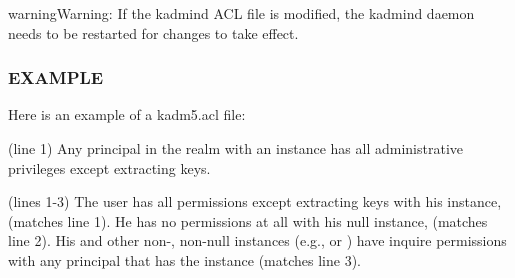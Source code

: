 \documentclass[letterpaper,10pt,english]{sphinxmanual}
\begin{document}
\begin{sphinxadmonition}{warning}{Warning:}
If the kadmind ACL file is modified, the kadmind daemon needs to be
restarted for changes to take effect.
\end{sphinxadmonition}


\subsubsection{EXAMPLE}
\label{\detokenize{admin/conf_files/kadm5_acl:example}}
Here is an example of a kadm5.acl file:

%
\begin{sphinxVerbatim}[commandchars=\\\{\}]
                                   
                             
           
                  
                                   
               
\end{sphinxVerbatim}

(line 1) Any principal in the  realm with an
 instance has all administrative privileges except extracting
keys.

(lines 1-3) The user  has all permissions except
extracting keys with his  instance,
 (matches line 1).  He has no
permissions at all with his null instance, 
(matches line 2).  His  and other non-, non-null
instances (e.g.,  or ) have inquire permissions
with any principal that has the instance  (matches line 3).
\end{document}
